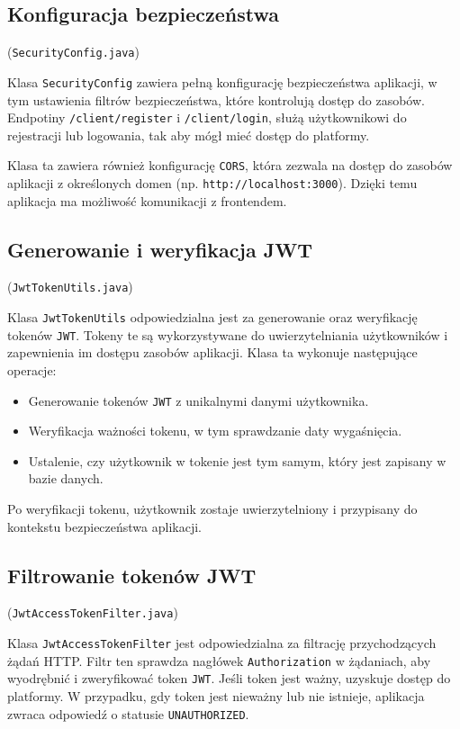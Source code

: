 \subsection{Konfiguracja bezpieczeństwa} (\texttt{SecurityConfig.java})

Klasa \texttt{SecurityConfig} zawiera pełną konfigurację bezpieczeństwa aplikacji, w tym ustawienia filtrów bezpieczeństwa, które kontrolują dostęp do zasobów. Endpotiny \texttt{/client/register} i \texttt{/client/login}, służą użytkownikowi do rejestracji lub logowania, tak aby mógł mieć dostęp do platformy. 

Klasa ta zawiera również konfigurację \texttt{CORS}, która zezwala na dostęp do zasobów aplikacji z określonych domen (np. \texttt{http://localhost:3000}). Dzięki temu aplikacja ma możliwość komunikacji z frontendem.

\subsection{Generowanie i weryfikacja JWT} (\texttt{JwtTokenUtils.java})

Klasa \texttt{JwtTokenUtils} odpowiedzialna jest za generowanie oraz weryfikację tokenów \texttt{JWT}. Tokeny te są wykorzystywane do uwierzytelniania użytkowników i zapewnienia im dostępu zasobów aplikacji. Klasa ta wykonuje następujące operacje:
\begin{itemize}
    \item Generowanie tokenów \texttt{JWT} z unikalnymi danymi użytkownika.
    \item Weryfikacja ważności tokenu, w tym sprawdzanie daty wygaśnięcia.
    \item Ustalenie, czy użytkownik w tokenie jest tym samym, który jest zapisany w bazie danych.
\end{itemize}
Po weryfikacji tokenu, użytkownik zostaje uwierzytelniony i przypisany do kontekstu bezpieczeństwa aplikacji.

\subsection{Filtrowanie tokenów JWT} (\texttt{JwtAccessTokenFilter.java})

Klasa \texttt{JwtAccessTokenFilter} jest odpowiedzialna za filtrację przychodzących żądań HTTP. Filtr ten sprawdza nagłówek \texttt{Authorization} w żądaniach, aby wyodrębnić i zweryfikować token \texttt{JWT}. Jeśli token jest ważny, uzyskuje dostęp do platformy. W przypadku, gdy token jest nieważny lub nie istnieje, aplikacja zwraca odpowiedź o statusie \texttt{UNAUTHORIZED}.

